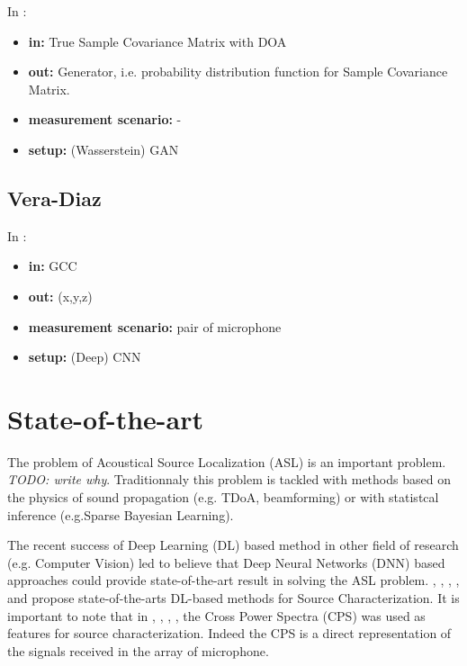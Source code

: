 \documentclass{article}
\begin{document}
In \cite{gerstoft2020parametric}:

\begin{itemize}
    \item \textbf{in:} True Sample Covariance Matrix with DOA
    \item \textbf{out:} Generator, i.e. probability distribution function for Sample Covariance Matrix.
    \item \textbf{measurement scenario:} -
    \item \textbf{setup:} (Wasserstein) GAN
\end{itemize}

\subsection{Vera-Diaz}

In \cite{vera2021acoustic}:

\begin{itemize}
    \item \textbf{in:} GCC
    \item \textbf{out:} (x,y,z)
    \item \textbf{measurement scenario:} pair of microphone
    \item \textbf{setup:} (Deep) CNN
\end{itemize}



\section{State-of-the-art}

The problem of Acoustical Source Localization (ASL) is an important problem. \textit{TODO: write why}. Traditionnaly this problem is tackled with methods based on the physics of sound propagation (e.g. TDoA, beamforming) or with statistcal inference (e.g.Sparse Bayesian Learning). 

The recent success of Deep Learning (DL) based method in other field of research (e.g. Computer Vision) led to believe that Deep Neural Networks (DNN) based approaches could provide state-of-the-art result in solving the ASL problem. \cite{castellini2021neural}, \cite{kujawski2019deep}, \cite{lee2021deep}, \cite{ma2019phased}, \cite{pinto2021deconvoluting} and \cite{xue2020sound} propose state-of-the-arts DL-based methods for Source Characterization. It is important to note that in \cite{castellini2021neural}, \cite{lee2021deep}, \cite{ma2019phased}, \cite{xue2020sound}, the Cross Power Spectra (CPS) was used as features for source characterization. Indeed the CPS is a direct representation of the signals received in the array of microphone.
\end{document}
